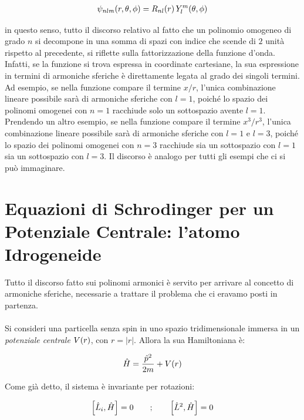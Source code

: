 \begin{nb}
\begin{align*}
	\psi_{nlm}\qty(r, \theta, \phi) = R_{nl}\qty(r) \, Y_l^m\qty(\theta, \phi)
\end{align*}
\end{nb}

	in questo senso, tutto il discorso relativo al fatto che un polinomio omogeneo di grado $n$ si decompone in una somma di spazi con indice che scende di $2$ unità rispetto al precedente, si riflette sulla fattorizzazione della funzione d’onda. Infatti, se la funzione si trova espressa in coordinate cartesiane, la sua espressione in termini di armoniche sferiche è direttamente legata al grado dei singoli termini. Ad esempio, se nella funzione compare il termine $x/r$, l'unica combinazione lineare possibile sarà di armoniche sferiche con $l = 1$, poiché lo spazio dei polinomi omogenei con $n = 1$ racchiude solo un sottospazio avente $l = 1$. Prendendo un altro esempio, se nella funzione compare il termine $x^3/r^3$, l’unica combinazione lineare possibile sarà di armoniche sferiche con $l = 1$ e $l = 3$, poiché lo spazio dei polinomi omogenei con $n = 3$ racchiude sia un sottospazio con $l = 1$ sia un sottospazio con $ l = 3$. Il discorso è analogo per tutti gli esempi che ci si può immaginare.

\section{Equazioni di Schrodinger per un Potenziale Centrale: l'atomo Idrogeneide}

	Tutto il discorso fatto sui polinomi armonici è servito per arrivare al concetto di armoniche sferiche, necessarie a trattare il problema che ci eravamo posti in partenza. 
	\\
	\\
	Si consideri una particella senza spin in uno spazio tridimensionale immersa in un \textit{potenziale centrale} $V\qty(r)$, con $r = |r|$. Allora la sua Hamiltoniana è:
	
\begin{align*}
	\hat{H} = \frac{\hat{p}^2}{2m} + V\qty(r)
\end{align*}

	Come già detto, il sistema è invariante per rotazioni:
	
\begin{align*}
	\qty[\hat{L}_i, \hat{H}] = 0 \qquad ; \qquad \qty[\hat{L}^2, \hat{H}] = 0
\end{align*}

